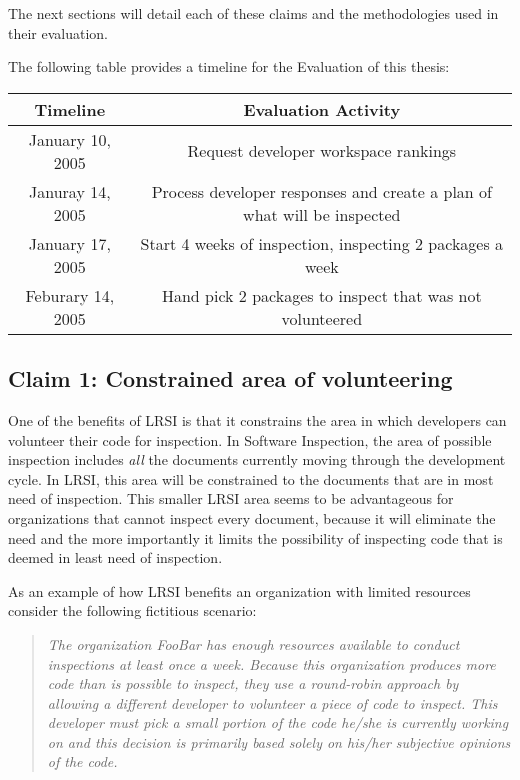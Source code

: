The next sections will detail each of these claims and the methodologies
used in their evaluation.

The following table provides a timeline for the Evaluation of this thesis:

\begin{center}
\begin{tabular}[h] {|c|c|} \hline 
Timeline & Evaluation Activity \\ \hline
January 10, 2005 & Request developer workspace rankings \\ \hline
Januray 14, 2005 & Process developer responses and create a plan of what
will be inspected \\ \hline
January 17, 2005 & Start 4 weeks of inspection, inspecting 2 packages a
week \\ \hline
Feburary 14, 2005 & Hand pick 2 packages to inspect that was not
volunteered \\ \hline
\end{tabular}
\end{center}



\subsection{Claim 1: Constrained area of volunteering}
\label{sec:claim1}
One of the benefits of LRSI is that it constrains the area in which
developers can volunteer their code for inspection. In Software Inspection,
the area of possible inspection includes \textit{all} the documents
currently moving through the development cycle. In LRSI, this area will be
constrained to the documents that are in most need of inspection. This
smaller LRSI area seems to be advantageous for organizations that cannot
inspect every document, because it will eliminate the need and the more
importantly it limits the possibility of inspecting code that is deemed in
least need of inspection.

As an example of how LRSI benefits an organization with limited resources
consider the following fictitious scenario:

\begin{quotation}
  \textit{ The organization FooBar has enough resources available to
    conduct inspections at least once a week. Because this organization
    produces more code than is possible to inspect, they use a round-robin
    approach by allowing a different developer to volunteer a piece of code
    to inspect. This developer must pick a small portion of the code he/she
    is currently working on and this decision is primarily based solely on
    his/her subjective opinions of the code.  }
\end{quotation}

